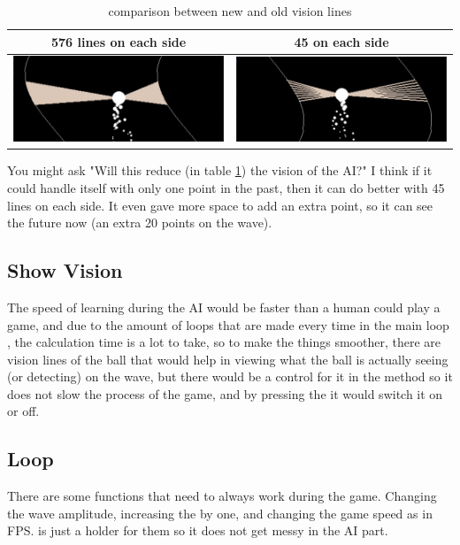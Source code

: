 \begin{table}[H]
	\centering
\begin{tabular}{|c|c|}
	\hline
	576 lines on each side	& 45 on each side \\ \hline
		\includegraphics[width=0.5\linewidth]{"usedImages/vision 576 lines"}& \includegraphics[width=0.5\linewidth]{"usedImages/vision 45 lines"} \\ \hline
	\end{tabular}
\caption{comparison between new and old vision lines}
\label{fig:oldVsNewVisionLines}
\end{table}

You might ask "Will this reduce (in table \ref{fig:oldVsNewVisionLines}) the vision of the AI?" I think if it could handle itself with only one point in the past, then it can do better with 45 lines on each side. It even gave more space to add an extra point, so it can see the future now (an extra 20 points on the wave).

\subsection{Show Vision}
The speed of learning during the AI would be faster than a human could play a game, and due to the amount of loops that are made every time in the main loop , the calculation time is a lot to take, so to make the things smoother, there are vision lines of the ball that would help in viewing what the ball is actually seeing (or detecting) on the wave, but there would be a control for it in the  method so it does not slow the process of the game, and by pressing the  it would switch it on or off. 

\subsection{Loop}
There are some functions that need to always work during the game. Changing the wave amplitude, increasing the  by one, and changing the game speed as in FPS.  is just a holder for them so it does not get messy in the AI part.

